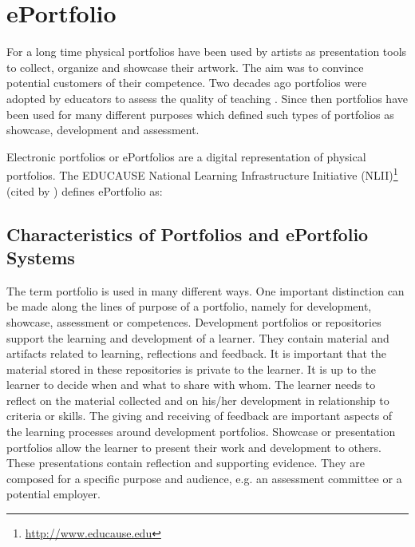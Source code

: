 \section{ePortfolio}
For a long time physical portfolios have been used by artists as presentation
tools to collect, organize and showcase their artwork. The aim was to convince
potential customers of their competence. Two decades ago portfolios were adopted
by educators to assess the quality of teaching \citep{VanTartwijkJ.2004}. Since
then portfolios have been used for many different purposes which defined such
types of portfolios as showcase, development and assessment.
 
Electronic portfolios or ePortfolios are a digital representation of physical
portfolios. The EDUCAUSE National Learning Infrastructure Initiative
(NLII)\footnote{\url{http://www.educause.edu}} (cited by
\citealp{IMSGlobalLearningConsortium2005}) defines ePortfolio as:


\subsection{Characteristics of Portfolios and ePortfolio Systems}
The term portfolio is used in many different ways. One important distinction can
be made along the lines of purpose of a portfolio, namely for development,
showcase, assessment or competences. Development portfolios or repositories
support the learning and development of a learner. They contain material and
artifacts related to learning, reflections and feedback. It is important that
the material stored in these repositories is private to the learner. It is up to
the learner to decide when and what to share with whom. The learner needs to
reflect on the material collected and on his/her development in relationship to
criteria or skills. The giving and receiving of feedback are important aspects
of the learning processes around development portfolios. Showcase or
presentation portfolios allow the learner to present their work and development
to others. These presentations contain reflection and supporting evidence. They
are composed for a specific purpose and audience, e.g. an assessment committee
or a potential employer.

